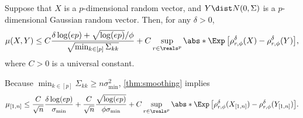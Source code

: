 \documentclass[aos]{imsart}
\begin{document}
\begin{lemma} \label{thm:smoothing}
Suppose that $X$ is a $p$-dimensional random vector, and $Y \dist N(0,\Sigma)$ is a $p$-dimensional Gaussian random vector. Then, for any $\delta > 0$,
\begin{equation*}
    \mu(X, Y) 
    \leq C \frac{\delta\log(ep) + \sqrt{\log(ep)}/\phi}{\sqrt{\min_{k \in [p]} \Sigma_{kk}}}
    + C \sup_{r \in \reals^p} \abs*{ \Exp\left[\rho_{r,\phi}^\delta(X) - \rho_{r,\phi}^\delta(Y)\right]},
\end{equation*}
where $C > 0$ is a universal constant.
\end{lemma}

Because $\min_{k \in [p]} \Sigma_{kk} \geq n \sigma_{\min}^2$, \cref{thm:smoothing} implies
\begin{equation*}
    \mu_{[1,n]} 
    \leq \frac{C}{\sqrt{n}} \frac{\delta \log(ep)}{\sigma_{\min}}  
    + \frac{C}{\sqrt{n}} \frac{\sqrt{\log(ep)}}{\phi \sigma_{\min}}
    + C \sup_{r \in \reals^p} \abs*{ \Exp\left[\rho_{r,\phi}^\delta(X_{[1,n]}) - \rho_{r,\phi}^\delta(Y_{[1,n]})\right]}.
\end{equation*}
\end{document}
